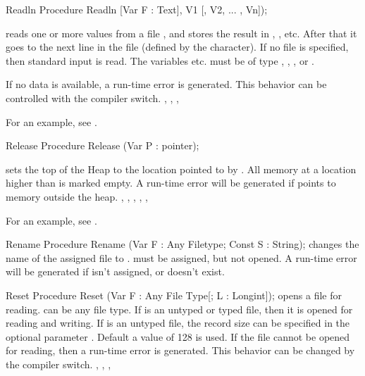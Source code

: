 \documentclass{report}
\begin{document}

\begin{procedure}{Readln}
\Declaration
Procedure Readln [Var F : Text], V1 [, V2, ... , Vn]);

\Description
{} reads one or more values from a file , and stores the
result in , , etc. After that it goes to the next line in
the file (defined by the  character).
If no file  is specified, then standard input is read.
The variables  etc. must be of type , ,
,  or .

\Errors
If no data is available, a run-time error is generated. This behavior can
be controlled with the  compiler switch.
\SeeAlso
{}, , , 
\end{procedure}
For an example, see .
\begin{procedure}{Release}
\Declaration
Procedure Release (Var P : pointer);

\Description
{} sets the top of the Heap to the location pointed to by
. All memory at a location higher than  is marked empty.
\Errors
A run-time error will be generated if  points to memory outside the
heap.
\SeeAlso
{}, , , , 
, 
\end{procedure}
For an example, see .
\begin{procedure}{Rename}
\Declaration
Procedure Rename (Var F : Any Filetype; Const S : String);
\Description
{} changes the name of the assigned file  to .
must be assigned, but not opened.
\Errors
A run-time error will be generated if  isn't assigned,
or doesn't exist.
\SeeAlso
{}
\end{procedure}


\begin{procedure}{Reset}
\Declaration
Procedure Reset (Var F : Any File Type[; L : Longint]);
\Description
{} opens a file  for reading.  can be any file type.
If  is an untyped or typed file, then it is opened for reading and
writing. If  is an untyped file, the record size can be specified in
the optional parameter . Default a value of 128 is used.
\Errors
If the file cannot be opened for reading, then a run-time error is
generated. This behavior can be changed by the  compiler switch.
\SeeAlso
{}, , , 
\end{procedure}
\end{document}
